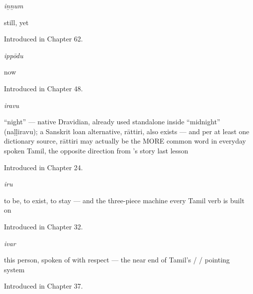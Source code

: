 \noindent\begin{minipage}[t]{\linewidth}
\raggedright
\textbf{}\enspace\emph{iṉṉum}\par
\small still, yet\par
\footnotesize Introduced in Chapter 62.
\end{minipage}\par\medskip

\noindent\begin{minipage}[t]{\linewidth}
\raggedright
\textbf{}\enspace\emph{ippōdu}\par
\small now\par
\footnotesize Introduced in Chapter 48.
\end{minipage}\par\medskip

\noindent\begin{minipage}[t]{\linewidth}
\raggedright
\textbf{}\enspace\emph{iravu}\par
\small \textquotedblleft{}night\textquotedblright{} — native Dravidian, already used standalone inside \textquotedblleft{}midnight\textquotedblright{} (naḷḷiravu); a Sanskrit loan alternative, rāttiri, also exists — and per at least one dictionary source, rāttiri may actually be the MORE common word in everyday spoken Tamil, the opposite direction from 's story last lesson\par
\footnotesize Introduced in Chapter 24.
\end{minipage}\par\medskip

\noindent\begin{minipage}[t]{\linewidth}
\raggedright
\textbf{}\enspace\emph{iru}\par
\small to be, to exist, to stay — and the three-piece machine every Tamil verb is built on\par
\footnotesize Introduced in Chapter 32.
\end{minipage}\par\medskip

\noindent\begin{minipage}[t]{\linewidth}
\raggedright
\textbf{}\enspace\emph{ivar}\par
\small this person, spoken of with respect — the near end of Tamil's  /  /  pointing system\par
\footnotesize Introduced in Chapter 37.
\end{minipage}\par\medskip

